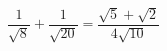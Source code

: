 $\dfrac{1}{\sqrt{8}}+\dfrac{1}{\sqrt{20}} = \dfrac{\sqrt{5}+\sqrt{2}}{4\sqrt{10}}$

\begin{reponses}
\end{reponses}

